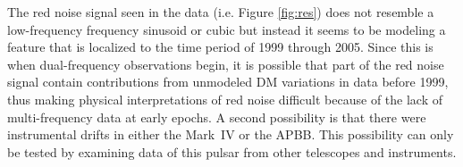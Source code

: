 {The red noise signal seen in the data (i.e. Figure \ref{fig:res}) does not
resemble a low-frequency frequency sinusoid or cubic
but instead it seems to be modeling a feature that is
localized to the time period of 1999 through 2005. Since this is when
dual-frequency observations begin, it is possible that part of the red noise
signal contain contributions from unmodeled DM variations in data before 1999, thus making physical interpretations of red noise difficult because of the lack of multi-frequency data at early epochs.
A second possibility is that there were instrumental drifts in either the
Mark~IV or the APBB. This possibility can only be tested by examining data of
this pulsar from other telescopes and instruments. 
}







